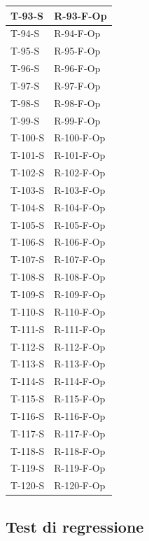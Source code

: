 \documentclass[a4paper,12pt]{article}
\begin{document}
{{\begin{longtable}{|
                    >{\centering\arraybackslash}p{}|
                    >{\centering\arraybackslash}p{}|
                }
                T-93-S & R-93-F-Op \\ \hline
                T-94-S & R-94-F-Op \\ \hline
                T-95-S & R-95-F-Op \\ \hline
                T-96-S & R-96-F-Op \\ \hline
                T-97-S & R-97-F-Op \\ \hline
                T-98-S & R-98-F-Op \\ \hline
                T-99-S & R-99-F-Op \\ \hline
                T-100-S & R-100-F-Op \\ \hline
                T-101-S & R-101-F-Op \\ \hline
                T-102-S & R-102-F-Op \\ \hline
                T-103-S & R-103-F-Op \\ \hline
                T-104-S & R-104-F-Op \\ \hline
                T-105-S & R-105-F-Op \\ \hline
                T-106-S & R-106-F-Op \\ \hline
                T-107-S & R-107-F-Op \\ \hline
                T-108-S & R-108-F-Op \\ \hline
                T-109-S & R-109-F-Op \\ \hline
                T-110-S & R-110-F-Op \\ \hline
                T-111-S & R-111-F-Op \\ \hline
                T-112-S & R-112-F-Op \\ \hline
                T-113-S & R-113-F-Op \\ \hline
                T-114-S & R-114-F-Op \\ \hline
                T-115-S & R-115-F-Op \\ \hline
                T-116-S & R-116-F-Op \\ \hline
                T-117-S & R-117-F-Op \\ \hline
                T-118-S & R-118-F-Op \\ \hline
                T-119-S & R-119-F-Op \\ \hline
                T-120-S & R-120-F-Op \\ \hline
            \end{longtable}
    }

    \subsection{Test di regressione}{

}}
\end{document}
